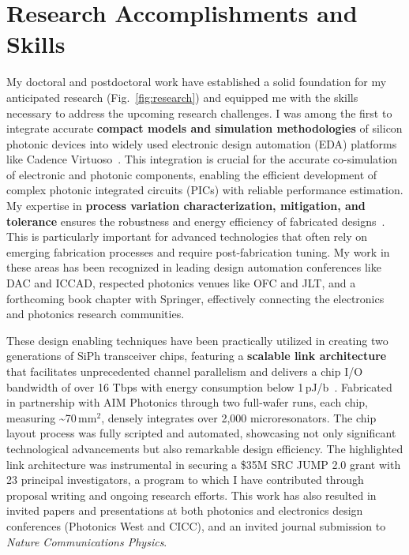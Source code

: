 \section{Research Accomplishments and Skills}
My doctoral and postdoctoral work have established a solid foundation for my anticipated research (Fig.~\ref{fig:research}) and equipped me with the skills necessary to address the upcoming research challenges. I was among the first to integrate accurate \textbf{compact models and simulation methodologies} of silicon photonic devices into widely used electronic design automation (EDA) platforms like Cadence Virtuoso~\cite{wuCompactModelingCircuitlevel2017,zhangCompactModelingSilicon2017}. This integration is crucial for the accurate co-simulation of electronic and photonic components, enabling the efficient development of complex photonic integrated circuits (PICs) with reliable performance estimation. My expertise in \textbf{process variation characterization, mitigation, and tolerance} ensures the robustness and energy efficiency of fabricated designs~\cite{wangCharacterizationApplicationsSpatial2020,wangEnergyEfficiencyYield2021,wangDispersionEngineeredFabricationRobustSOI2023}. This is particularly important for advanced technologies that often rely on emerging fabrication processes and require post-fabrication tuning. My work in these areas has been recognized in leading design automation conferences like DAC and ICCAD, respected photonics venues like OFC and JLT, and a forthcoming book chapter with Springer, effectively connecting the electronics and photonics research communities.

These design enabling techniques have been practically utilized in creating two generations of SiPh transceiver chips, featuring a \textbf{scalable link architecture} that facilitates unprecedented channel parallelism and delivers a chip I/O bandwidth of over 16 Tbps with energy consumption below 1\,pJ/b~\cite{wangScalableArchitectureSubpJ2023,wangCICC2024}. Fabricated in partnership with AIM Photonics through two full-wafer runs, each chip, measuring \textasciitilde{}70\,mm$^\text{2}$, densely integrates over 2,000 microresonators. The chip layout process was fully scripted and automated, showcasing not only significant technological advancements but also remarkable design efficiency. The highlighted link architecture was instrumental in securing a \$35M SRC JUMP 2.0 grant with 23 principal investigators, a program to which I have contributed through proposal writing and ongoing research efforts. This work has also resulted in invited papers and presentations at both photonics and electronics design conferences (Photonics West and CICC), and an invited journal submission to \emph{Nature Communications Physics}.

